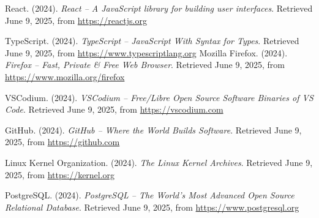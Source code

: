 \begin{thebibliography}{99}
    React. (2024). \textit{React – A JavaScript library for building user interfaces}. Retrieved June 9, 2025, from \url{https://reactjs.org}

    TypeScript. (2024). \textit{TypeScript – JavaScript With Syntax for Types}. Retrieved June 9, 2025, from \url{https://www.typescriptlang.org}
    Mozilla Firefox. (2024). \textit{Firefox – Fast, Private \& Free Web Browser}. Retrieved June 9, 2025, from \url{https://www.mozilla.org/firefox}
    
    VSCodium. (2024). \textit{VSCodium – Free/Libre Open Source Software Binaries of VS Code}. Retrieved June 9, 2025, from \url{https://vscodium.com}

    GitHub. (2024). \textit{GitHub – Where the World Builds Software}. Retrieved June 9, 2025, from \url{https://github.com}

    Linux Kernel Organization. (2024). \textit{The Linux Kernel Archives}. Retrieved June 9, 2025, from \url{https://kernel.org}

    PostgreSQL. (2024). \textit{PostgreSQL – The World's Most Advanced Open Source Relational Database}. Retrieved June 9, 2025, from \url{https://www.postgresql.org}

\end{thebibliography}
